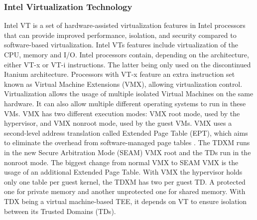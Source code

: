 \subsubsection{Intel Virtualization Technology}
Intel VT is a set of hardware-assisted virtualization features in Intel processors that can provide improved performance, isolation, and security compared to software-based virtualization. Intel VTs features include virtualization of the CPU, memory and I/O.
Intel processors contain, depending on the architecture, either VT-x or VT-i instructions. The latter being only used on the discontinued Itanium architecture. Processors with VT-x feature an extra instruction set known as Virtual Machine Extensions (VMX), allowing virtualization control. Virtualization allows the usage of multiple isolated Virtual Machines on the same hardware. It can also allow multiple different operating systems to run in these VMs\cite{intel_corporation_intel_nodate}. VMX has two different execution modes: VMX root mode, used by the hypervisor, and VMX nonroot mode, used by the guest VMs. VMX uses a second-level address translation called Extended Page Table (EPT), which aims to eliminate the overhead from software-managed page tables \cite{uhlig_intel_2005}. The \Gls{TDXM} runs in the new Secure Arbitration Mode (SEAM) VMX root and the TDs run in the nonroot mode. The biggest change from normal VMX to SEAM VMX is the usage of an additional Extended Page Table. With VMX the hypervisor holds only one table per guest kernel, the TDXM has two per guest TD. A protected one for private memory and another unprotected one for shared memory.
With TDX being a virtual machine-based \Gls{TEE}, it depends on VT to ensure isolation between its Trusted Domains (TDs)\cite{cheng_intel_2023}.
